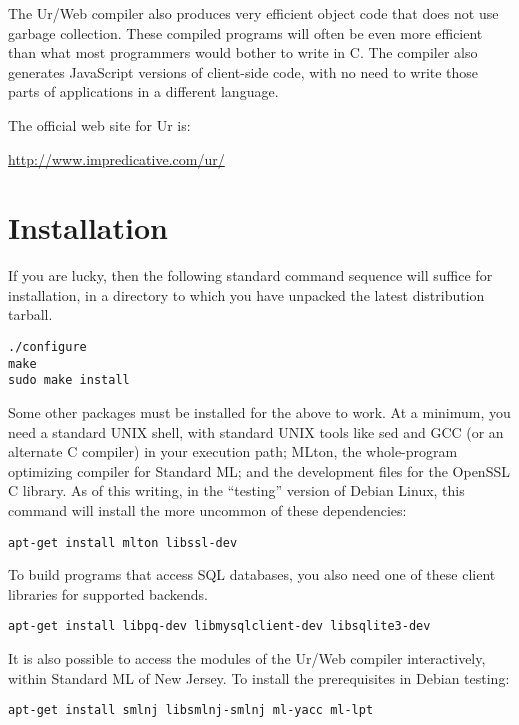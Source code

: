 \documentclass{article}
\begin{document}
The Ur/Web compiler also produces very efficient object code that does not use garbage collection.  These compiled programs will often be even more efficient than what most programmers would bother to write in C.  The compiler also generates JavaScript versions of client-side code, with no need to write those parts of applications in a different language.

\medskip

The official web site for Ur is:
\begin{center}
  \url{http://www.impredicative.com/ur/}
\end{center}


\section{Installation}

If you are lucky, then the following standard command sequence will suffice for installation, in a directory to which you have unpacked the latest distribution tarball.

\begin{verbatim}
./configure
make
sudo make install
\end{verbatim}

Some other packages must be installed for the above to work.  At a minimum, you need a standard UNIX shell, with standard UNIX tools like sed and GCC (or an alternate C compiler) in your execution path; MLton, the whole-program optimizing compiler for Standard ML; and the development files for the OpenSSL C library.  As of this writing, in the ``testing'' version of Debian Linux, this command will install the more uncommon of these dependencies:
\begin{verbatim}
apt-get install mlton libssl-dev
\end{verbatim}

To build programs that access SQL databases, you also need one of these client libraries for supported backends.
\begin{verbatim}
apt-get install libpq-dev libmysqlclient-dev libsqlite3-dev
\end{verbatim}

It is also possible to access the modules of the Ur/Web compiler interactively, within Standard ML of New Jersey.  To install the prerequisites in Debian testing:
\begin{verbatim}
apt-get install smlnj libsmlnj-smlnj ml-yacc ml-lpt
\end{verbatim}
\end{document}
